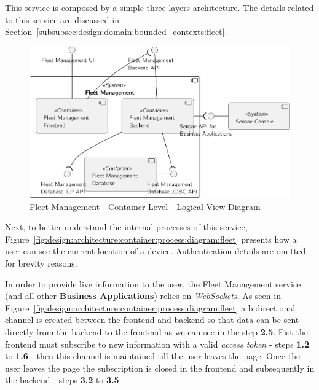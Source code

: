 This service is composed by a simple three layers architecture. The details related to this service are discussed in Section~\ref{subsubsec:design:domain:bounded_contexts:fleet}.

\begin{figure}[H]
   \centering
   \includegraphics[page=1,width=0.75\columnwidth]{assets/diagrams/design/architectural/level2/logical/fleet-management-context.pdf}
   \caption[Fleet Management - Container Level - Logical View Diagram]{Fleet Management - Container Level - Logical View Diagram}
   \label{fig:design:architecture:solutions:containers:logical:fleet}
\end{figure}

Next, to better understand the internal processes of this service, Figure~\ref{fig:design:architecture:container:process:diagram:fleet} presents how a user can see the current location of a device. Authentication details are omitted for brevity reasons.

In order to provide live information to the user, the Fleet Management service (and all other \textbf{Business Applications}) relies on \textit{WebSockets}. As seen in Figure~\ref{fig:design:architecture:container:process:diagram:fleet} a bidirectional channel is created between the frontend and backend so that data can be sent directly from the backend to the frontend as we can see in the step \textbf{2.5}. Fist the frontend must subscribe to new information with a valid \textit{access token} - steps \textbf{1.2} to \textbf{1.6} - then this channel is maintained till the user leaves the page. Once the user leaves the page the subscription is closed in the frontend and subsequently in the backend - steps \textbf{3.2} to \textbf{3.5}.

